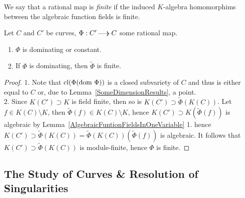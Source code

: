     \begin{definition}
        We say that a rational map is \textit{finite} if the induced $K$-algebra homomorphims between the algebraic function fields is finite.
    \end{definition}
    \begin{lemma}\label{RationalMapBetweenCurvesAreDominatingOrConstant}
        Let $C$ and $C'$ be curves, $\Phi: C'\dottedarrow C$ some rational map. 
        \begin{enumerate}
            \item $\Phi$ is dominating or constant.
            \item If $\Phi$ is dominating, then $\widetilde{\Phi}$ is finite.
        \end{enumerate}
    \end{lemma}
    \begin{proof}
        1. Note that $\mathrm{cl}(\Phi(\mathrm{dom} \ \Phi))$ is a closed subvariety of $C$ and thus is either equal to $C$ or, due to Lemma~\ref{SomeDimensionResults}, a point.\\
        2.  Since $K(C')\supset K$ is field finite, then so is $K(C')\supset \widetilde{\Phi}(K(C))$. Let $f\in K(C)\setminus K$, then $\widetilde{\Phi}(f)\in K(C)\setminus K$, hence $K(C')\supset K(\widetilde{\Phi}(f))$ is algebraic by Lemma~\ref{AlgebraicFuntionFieldsInOneVariable} 1. hence $K(C')\supset \widetilde{\Phi}(K(C)) = \widetilde{\Phi}(K(C))(\widetilde{\Phi}(f))$ is algebraic. It follows that $K(C')\supset \widetilde{\Phi}(K(C))$ is module-finite, hence $\Phi$ is finite.  
    \end{proof}
\subsection{The Study of Curves \& Resolution of Singularities}

